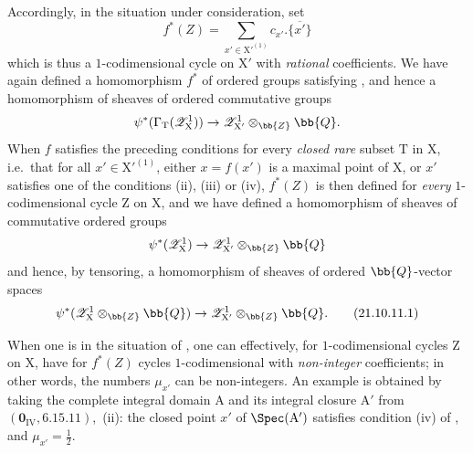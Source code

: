 \begin{env}[21.10.11]
Accordingly, in the situation under consideration, set
\[
  f^*(Z)=\sum_{x'\in\mathrm{X}'^{(1)}} c_{x'}.\overline{\{x'\}}
\]
which is thus a $1$-codimensional cycle on $\mathrm{X}'$ with \emph{rational} coefficients.
We have again defined a homomorphism $f^*$ of ordered groups satisfying , and hence a homomorphism of sheaves of ordered commutative groups
\[
  \psi^*(\Gamma_{\mathrm{T}}(\mathscr{Z}^1_{\mathrm{X}}))\to\mathscr{Z}^1_{\mathrm{X}'}\otimes_{\bb{Z}}\bb{Q}.
\]
When $f$ satisfies the preceding conditions for every \emph{closed rare} subset $\mathrm{T}$ in $\mathrm{X}$, i.e.\ that for all $x'\in\mathrm{X}'^{(1)}$, either $x=f(x')$ is a maximal point of $\mathrm{X}$, or $x'$ satisfies one of the conditions (ii), (iii) or (iv), $f^*(Z)$ is then defined for \emph{every} $1$-codimensional cycle $\mathrm{Z}$ on $\mathrm{X}$, and we have defined a homomorphism of sheaves of commutative ordered groups
\[
  \psi^*(\mathscr{Z}^1_{\mathrm{X}})\to\mathscr{Z}^1_{\mathrm{X}'}\otimes_{\bb{Z}}\bb{Q}
\]
and hence, by tensoring, a homomorphism of sheaves of ordered $\bb{Q}$-vector spaces
\[
\label{IV.21.10.11.1}
  \psi^*(\mathscr{Z}^1_{\mathrm{X}}\otimes_{\bb{Z}}\bb{Q})\to\mathscr{Z}^1_{\mathrm{X}'}\otimes_{\bb{Z}}\bb{Q}.
  \tag{21.10.11.1}
\]
\end{env}

\begin{remark}[21.10.12]
\label{IV.21.10.12}
When one is in the situation of , one can effectively, for $1$-codimensional cycles $\mathrm{Z}$ on $\mathrm{X}$, have for $f^*(Z)$ cycles $1$-codimensional with \emph{non-integer} coefficients; in other words, the numbers $\mu_{x'}$ can be non-integers.
An example is obtained by taking the complete integral domain $\mathrm{A}$ and its integral closure $\mathrm{A}'$ from $(\mathbf{0}_{\mathrm{IV}},6.15.11)$,~(ii): the closed point $x'$ of $\Spec(\mathrm{A}')$ satisfies condition (iv) of , and $\mu_{x'}=\frac12$.
\end{remark}

